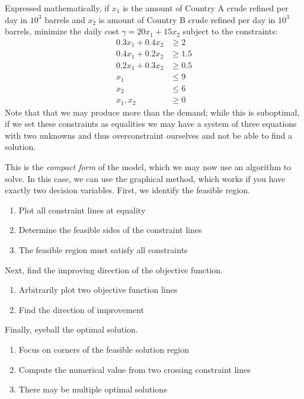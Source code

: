 Expressed mathematically, if $x_1$ is the amount of 
Country A crude refined per day in $10^3$ barrels and 
$x_2$ is amount of Country B crude refined per day in 
$10^3$ barrels, minimize the daily cost 
$\gamma = 20x_1 + 15x_2$ subject to the constraints:
\begin{align}
    0.3x_1 + 0.4x_2 &\geq 2 \\
    0.4x_1 + 0.2x_2 &\geq 1.5 \\
    0.2x_1 + 0.3x_2 &\geq 0.5 \\
    x_1 &\leq 9 \\
    x_2 &\leq 6 \\
    x_1, x_2 &\geq 0 
\end{align}
Note that that we may produce more than 
the demand; while this is suboptimal, if 
we set these constraints as equalities we may 
have a system of three equations 
with two unknowns and thus overconstraint 
ourselves and not be able to find a solution. 
    
This is the \emph{compact form} of the model, which 
we may now use an algorithm to solve. 
In this case, we can use the graphical method, 
which works if you have exactly two 
decision variables. First, 
we identify the feasible region.
\begin{enumerate}
    \item Plot all constraint lines at equality
    \item Determine the feasible sides of the constraint lines
    \item The feasible region must satisfy all constraints
\end{enumerate}
Next, find the improving 
direction of the objective 
function. 
\begin{enumerate}
    \item Arbitrarily plot two objective function lines
    \item Find the direction of improvement
\end{enumerate}
Finally, eyeball the optimal solution.
\begin{enumerate}
    \item Focus on corners of the feasible solution region
    \item Compute the numerical value from two crossing constraint lines
    \item There may be multiple optimal solutions
\end{enumerate}

